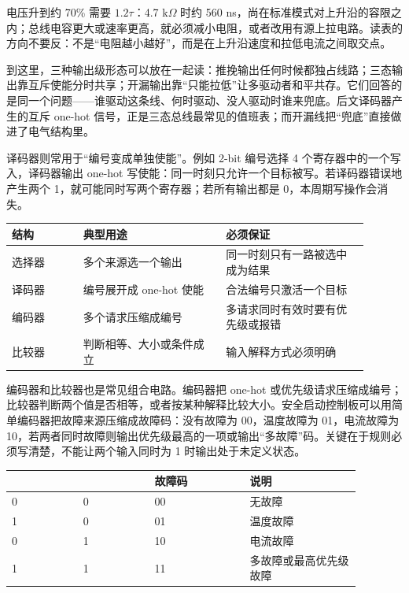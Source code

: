 电压升到约 70\% 需要 $1.2\tau$：4.7 k$\Omega$ 时约 560 ns，尚在标准模式对上升沿的容限之内；总线电容更大或速率更高，就必须减小电阻，或者改用有源上拉电路。读表的方向不要反：不是“电阻越小越好”，而是在上升沿速度和拉低电流之间取交点。

到这里，三种输出级形态可以放在一起读：推挽输出任何时候都独占线路；三态输出靠互斥使能分时共享；开漏输出靠“只能拉低”让多驱动者和平共存。它们回答的是同一个问题——谁驱动这条线、何时驱动、没人驱动时谁来兜底。后文译码器产生的互斥 one-hot 信号，正是三态总线最常见的值班表；而开漏线把“兜底”直接做进了电气结构里。

译码器则常用于“编号变成单独使能”。例如 2-bit 编号选择 4 个寄存器中的一个写入，译码器输出 one-hot 写使能：同一时刻只允许一个目标被写。若译码器错误地产生两个 1，就可能同时写两个寄存器；若所有输出都是 0，本周期写操作会消失。

\begin{longtable}{L{0.18\linewidth}L{0.36\linewidth}L{0.36\linewidth}}
\toprule
结构 & 典型用途 & 必须保证 \\
\midrule
选择器 & 多个来源选一个输出 & 同一时刻只有一路被选中成为结果 \\
译码器 & 编号展开成 one-hot 使能 & 合法编号只激活一个目标 \\
编码器 & 多个请求压缩成编号 & 多请求同时有效时要有优先级或报错 \\
比较器 & 判断相等、大小或条件成立 & 输入解释方式必须明确 \\
\bottomrule
\end{longtable}

编码器和比较器也是常见组合电路。编码器把 one-hot 或优先级请求压缩成编号；比较器判断两个值是否相等，或者按某种解释比较大小。安全启动控制板可以用简单编码器把故障来源压缩成故障码：没有故障为 00，温度故障为 01，电流故障为 10，若两者同时故障则输出优先级最高的一项或输出“多故障”码。关键在于规则必须写清楚，不能让两个输入同时为 1 时输出处于未定义状态。

\begin{longtable}{L{0.18\linewidth}L{0.18\linewidth}L{0.24\linewidth}L{0.28\linewidth}}
\toprule
{} &  & 故障码 & 说明 \\
 & 0 & 00 & 无故障 \\
1 & 0 & 01 & 温度故障 \\
0 & 1 & 10 & 电流故障 \\
1 & 1 & 11 & 多故障或最高优先级故障 \\
\bottomrule
\end{longtable}

